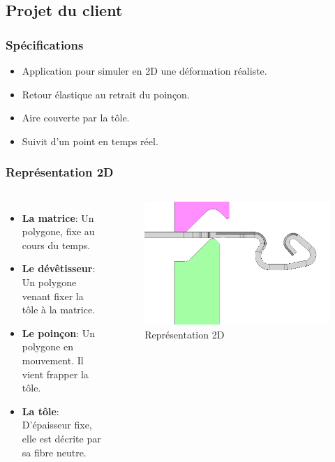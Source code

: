 \documentclass{beamer}
\begin{document}
\subsection{Projet du client}
\begin{frame}
    \frametitle{Spécifications}
    \begin{itemize}
        \item Application pour simuler en 2D une déformation réaliste.
        \item Retour élastique au retrait du poinçon.
        \item Aire couverte par la tôle.
        \item Suivit d'un point en temps réel.
    \end{itemize}
\end{frame}
\begin{frame}
    \frametitle{Représentation 2D}
    \begin{columns}
        \begin{itemize}
            \item \textbf{La matrice}: 
                Un polygone, fixe au cours du temps.
            \item \textbf{Le dévêtisseur}:
                Un polygone venant fixer la tôle à la matrice.
            \item \textbf{Le poinçon}:
                Un polygone en mouvement. Il vient frapper la tôle.
            \item \textbf{La tôle}:
                D'épaisseur fixe, elle est décrite par sa fibre neutre.
        \end{itemize}
        \begin{figure}
            \includegraphics[width=\textwidth]{img/fibreNeutre.jpg}
            \caption{Représentation 2D}
        \end{figure}
    \end{columns}
\end{frame}
\end{document}
